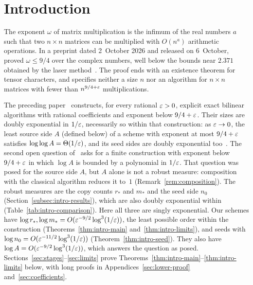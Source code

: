 \section{Introduction}
\label{sec:intro}

The exponent \(\omega\) of matrix multiplication is the infimum of the
real numbers \(a\) such that two \(n\times n\) matrices can be multiplied
with \(O(n^a)\) arithmetic operations. In a preprint dated 2~October 2026
and released on 6~October, \citet{OAI26} proved \(\omega\le9/4\) over the
complex numbers, well below the bounds near \(2.371\) obtained by the
laser method~\citep{AD25,Dup26,Zad26,OAI26Stag}. The proof ends with an
existence theorem for tensor characters, and specifies neither a size
\(n\) nor an algorithm for \(n\times n\) matrices with fewer than
\(n^{9/4+\varepsilon}\) multiplications.

The preceding paper~\citep{FinCon26} constructs, for every rational
\(\varepsilon>0\), explicit exact bilinear algorithms with rational coefficients
and exponent below \(9/4+\varepsilon\). Their sizes are doubly exponential in
\(1/\varepsilon\), necessarily so within that construction: as \(\varepsilon\to0\),
the least source side \(A\) (defined below) of a scheme with exponent at most
\(9/4+\varepsilon\) satisfies \(\log\log A=\Theta(1/\varepsilon)\), and its seed sides
are doubly exponential too~\citep[Corollary~11.2]{FinCon26}. The second
open question of~\citep[Section~11.5]{FinCon26} asks for a finite
construction with exponent below \(9/4+\varepsilon\) in which \(\log A\) is
bounded by a polynomial in \(1/\varepsilon\). That question was posed for the
source side \(A\), but \(A\) alone is not a robust measure: composition
with the classical algorithm reduces it to~\(1\)
(Remark~\ref{rem:composition}). The robust measures are the copy counts
\(r_*\) and \(m_*\) and the seed side \(n_0\)
(Section~\ref{subsec:intro-results}), which are also doubly exponential
within~\citep{FinCon26} (Table~\ref{tab:intro-comparison}). Here all
three are singly exponential. Our schemes have
\(\log r_*,\log m_*=O(\varepsilon^{-9/2}\log^3(1/\varepsilon))\), the least possible
order within the construction (Theorems~\ref{thm:intro-main}
and~\ref{thm:intro-limits}), and seeds with
\(\log n_0=O(\varepsilon^{-11/2}\log^3(1/\varepsilon))\)
(Theorem~\ref{thm:intro-seed}). They also have
\(\log A=O(\varepsilon^{-9/2}\log^3(1/\varepsilon))\), which answers the question as
posed.
Sections~\ref{sec:stages}--\ref{sec:limits} prove
Theorems~\ref{thm:intro-main}--\ref{thm:intro-limits} below, with long
proofs in Appendices~\ref{sec:lower-proof} and~\ref{sec:coefficients}.

